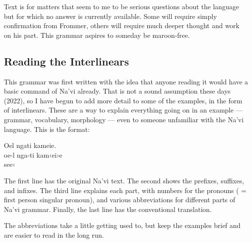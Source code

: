 Text  is for matters that seem to me to be serious
questions about the language but for which no answer is currently
available.  Some will require simply confirmation from Frommer, others
will require much deeper thought and work on his part.  This grammar
aspires to someday be maroon-free.


\subsection{Reading the Interlinears}
This grammar was first written with the idea that anyone reading it
would have a basic command of Na'vi already.  That is not a sound
assumption these days (2022), so I have begun to add more detail to
some of the examples, in the form of interlinears.  These are a way to
explain everything going on in an example — grammar, vocabulary,
morpho\-lo\-gy — even to someone unfamiliar with the Na'vi language.  This
is the format:

\begin{interlin}
 \glll Oel ngati kameie. \\
     oe-l nga-ti kam‹ei›e \\
       see‹ \\
\end{interlin}

\noindent The first line has the original Na'vi text.  The second
shows the prefixes, suffixes, and infixes.  The third line explains
each part, with numbers for the pronouns ( = first person
singular pronoun), and various abbreviations for different parts of
Na'vi grammar.  Finally, the last line has the conventional
translation. 

The abbreviations take a little getting used to, but keep the examples
brief and are easier to read in the long run.

